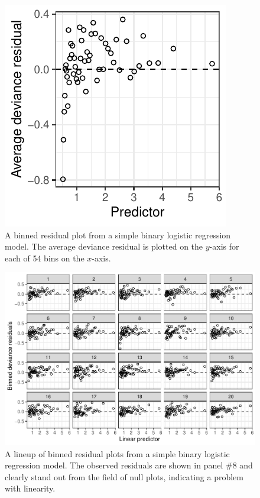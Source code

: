 \documentclass[12pt]{article}
\begin{document}
\begin{figure}
\centering
\includegraphics{figs/binned_resid_example.pdf}
\caption{\label{fig:binned} A binned residual plot from a simple binary
logistic regression model. The average deviance residual is plotted on
the \(y\)-axis for each of 54 bins on the \(x\)-axis.}
\end{figure}

\begin{figure}
\centering
\includegraphics{figs/wells_binned_residuals.pdf}
\caption{\label{fig:binnedlineup} A lineup of binned residual plots from
a simple binary logistic regression model. The observed residuals are
shown in panel \#8 and clearly stand out from the field of null plots,
indicating a problem with linearity.}
\end{figure}
\end{document}
